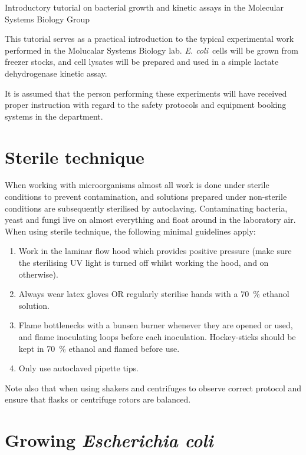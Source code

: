 \documentclass[a4paper]{article}
\newcommand{\ec}{\textit{E. coli}}
\begin{document}
 \begin{center} \huge Introductory tutorial on bacterial growth
and kinetic assays in the Molecular Systems Biology Group\\ \normalsize
\end{center} 

\begin{multicols}{2} This tutorial serves as a practical introduction to the
typical experimental work performed in the Molucalar Systems Biology lab. \ec\
cells will be grown from freezer stocks, and cell lysates will be prepared and
used in a simple lactate dehydrogenase kinetic assay.

It is assumed that the person performing these experiments will have received
proper instruction with regard to the safety protocols and equipment booking
systems in the department.

\section{Sterile technique} 

When working with microorganisms almost all work is done under sterile
conditions to prevent contamination, and solutions prepared under non-sterile
conditions are subsequently sterilised by autoclaving. Contaminating bacteria,
yeast and fungi live on almost everything and float around in the laboratory
air. When using sterile technique, the following minimal guidelines apply:

\begin{enumerate} 
\item Work in the laminar flow hood which provides positive
pressure (make sure the sterilising UV light is turned off whilst working the
hood, and on otherwise).  
\item Always wear latex gloves OR regularly sterilise
hands with a 70~\% ethanol solution.  
\item Flame bottlenecks with a bunsen
burner whenever they are opened or used, and flame inoculating loops before
each inoculation. Hockey-sticks should be kept in 70~\% ethanol and flamed
before use.  
\item Only use autoclaved pipette tips.  
\end{enumerate}

Note also that when using shakers and centrifuges to observe correct protocol
and ensure that flasks or centrifuge rotors are balanced.

\section{Growing \textit{Escherichia coli}} 


\end{multicols}
\end{document}
